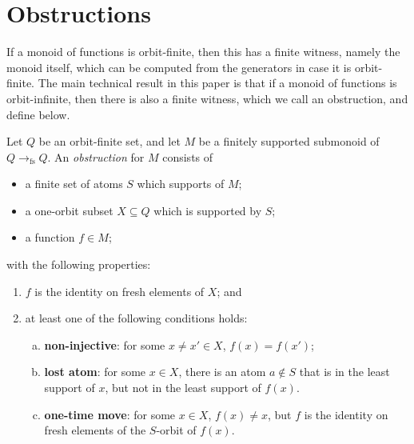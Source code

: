 \section{Obstructions}
\label{sec:obstructions}
If a monoid of functions is orbit-finite, then this has a finite witness, namely the  monoid itself, which can be computed from the generators in case it is orbit-finite. 
The main technical result in this paper is that if a monoid of functions is orbit-infinite, then there is also a finite witness, which we call an obstruction, and define below.

\newcommand{\fsfun}{\underset {\text{fs}} \longrightarrow}
\newcommand{\smallfsfun}{\to_{\text{fs}}}
\begin{definition}[Obstruction]
    Let $Q$ be an orbit-finite set, and let $M$ be a finitely supported  submonoid of $Q \smallfsfun Q$.
    An \emph{obstruction} for $M$ consists of 
    \begin{itemize}
        \item a finite set of atoms $S$ which supports of $M$;
        \item a one-orbit subset $X \subseteq Q$ which is supported by $S$;
        \item a function $f \in M$;
    \end{itemize}
    with the following properties:
    \begin{enumerate}
        \item $f$ is the identity on fresh elements  of  $X$; and 
        \item at least one of the following conditions holds: 
        \begin{enumerate}[(a)]
            \item \label{item:merge-obstruction}
             \textbf{non-injective}: for some $x \neq x' \in X$, $f(x) = f(x')$;
            \item \label{item:lost-atom-obstruction}
            \textbf{lost atom}: for some $x \in X$, there is an atom $a \notin S$ that is in the least support of $x$, but not in the least support of $f(x)$.
            \item \label{item:one-time-move-obstruction} \textbf{one-time move}: for some $x \in X$, $f(x) \neq x$, but $f$ is the identity on fresh elements of the $S$-orbit of $f(x)$.
        \end{enumerate}
    \end{enumerate}
\end{definition}



